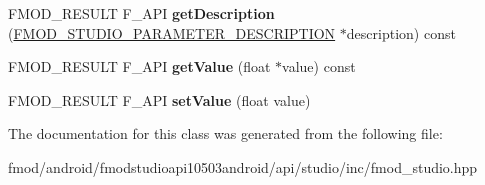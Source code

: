 \begin{DoxyCompactItemize}
\item 
\hypertarget{class_f_m_o_d_1_1_studio_1_1_parameter_instance_a575014705d78764ec15343752c4f6569}{F\+M\+O\+D\+\_\+\+R\+E\+S\+U\+L\+T F\+\_\+\+A\+P\+I {\bfseries get\+Description} (\hyperlink{struct_f_m_o_d___s_t_u_d_i_o___p_a_r_a_m_e_t_e_r___d_e_s_c_r_i_p_t_i_o_n}{F\+M\+O\+D\+\_\+\+S\+T\+U\+D\+I\+O\+\_\+\+P\+A\+R\+A\+M\+E\+T\+E\+R\+\_\+\+D\+E\+S\+C\+R\+I\+P\+T\+I\+O\+N} $\ast$description) const }\label{class_f_m_o_d_1_1_studio_1_1_parameter_instance_a575014705d78764ec15343752c4f6569}

\item 
\hypertarget{class_f_m_o_d_1_1_studio_1_1_parameter_instance_a22d849cba1512aafc84e72d433966aef}{F\+M\+O\+D\+\_\+\+R\+E\+S\+U\+L\+T F\+\_\+\+A\+P\+I {\bfseries get\+Value} (float $\ast$value) const }\label{class_f_m_o_d_1_1_studio_1_1_parameter_instance_a22d849cba1512aafc84e72d433966aef}

\item 
\hypertarget{class_f_m_o_d_1_1_studio_1_1_parameter_instance_a64ba1c8131a3c3515b9b9f477615536d}{F\+M\+O\+D\+\_\+\+R\+E\+S\+U\+L\+T F\+\_\+\+A\+P\+I {\bfseries set\+Value} (float value)}\label{class_f_m_o_d_1_1_studio_1_1_parameter_instance_a64ba1c8131a3c3515b9b9f477615536d}

\end{DoxyCompactItemize}


The documentation for this class was generated from the following file\+:\begin{DoxyCompactItemize}
\item 
fmod/android/fmodstudioapi10503android/api/studio/inc/fmod\+\_\+studio.\+hpp\end{DoxyCompactItemize}

